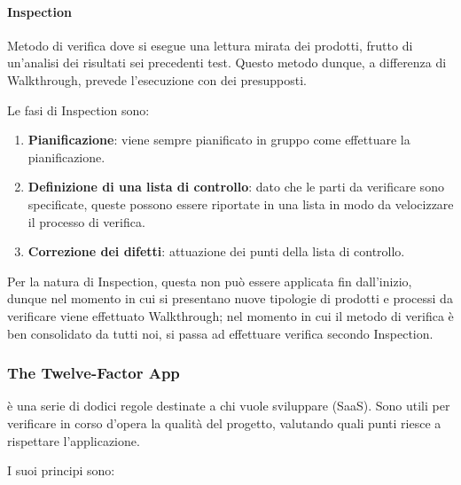 			\paragraph{Inspection}
			Metodo di verifica dove si esegue una lettura mirata dei prodotti, frutto di un'analisi dei risultati sei precedenti test.
			Questo metodo dunque, a differenza di Walkthrough, prevede l'esecuzione con dei presupposti.
	
			Le fasi di Inspection sono:
	
			\begin{enumerate}
				\item \textbf{Pianificazione}: viene sempre pianificato in gruppo come effettuare la pianificazione.
				\item \textbf{Definizione di una lista di controllo}: dato che le parti da verificare sono specificate, queste possono essere
				riportate in una lista in modo da velocizzare il processo di verifica.
				\item \textbf{Correzione dei difetti}: attuazione dei punti della lista di controllo.
			\end{enumerate}
	
			Per la natura di Inspection, questa non può essere applicata fin dall'inizio, dunque nel momento in cui si presentano nuove tipologie di
			prodotti e processi da verificare viene effettuato Walkthrough; nel momento in cui il metodo di verifica è ben consolidato da tutti noi,
			si passa ad effettuare verifica secondo Inspection.	

		\subsubsection{The Twelve-Factor App}
		 è una serie di dodici regole destinate a chi vuole sviluppare  (SaaS). Sono utili per verificare in corso d'opera la qualità del progetto, valutando quali punti riesce a rispettare l'applicazione.
		
		I suoi principi sono:
		
